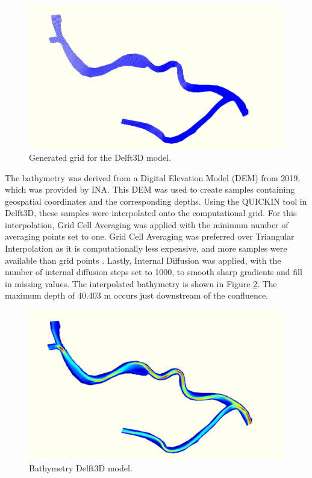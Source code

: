 \begin{figure}[H]
    \centering
    \includegraphics[width=0.75\linewidth]{figures/ch7/Grid_Guazu.png}
    \caption{Generated grid for the Delft3D model.}
    \label{fig: Grid Guazu Delft3D}
\end{figure}

The bathymetry was derived from a Digital Elevation Model (DEM) from 2019, which was provided by INA. This DEM was used to create samples containing geospatial coordinates and the corresponding depths. Using the QUICKIN tool in Delft3D, these samples were interpolated onto the computational grid. For this interpolation, Grid Cell Averaging was applied with the minimum number of averaging points set to one. Grid Cell Averaging was preferred over Triangular Interpolation as it is computationally less expensive, and more samples were available than grid points \autocite{deltaresQUICKINUserManual2025}. Lastly, Internal Diffusion was applied, with the number of internal diffusion steps set to 1000, to smooth sharp gradients and fill in missing values. The interpolated bathymetry is shown in Figure \ref{fig: Bathymetry Delft3D}. The maximum depth of 40.403 m occurs just downstream of the confluence. 

\begin{figure}[H]
    \centering
    \includegraphics[width=0.75\linewidth]{figures/ch7/Bathymetry_Gueazu_Delft3D.png}
    \caption{Bathymetry Delft3D model.}
    \label{fig: Bathymetry Delft3D}
\end{figure}

